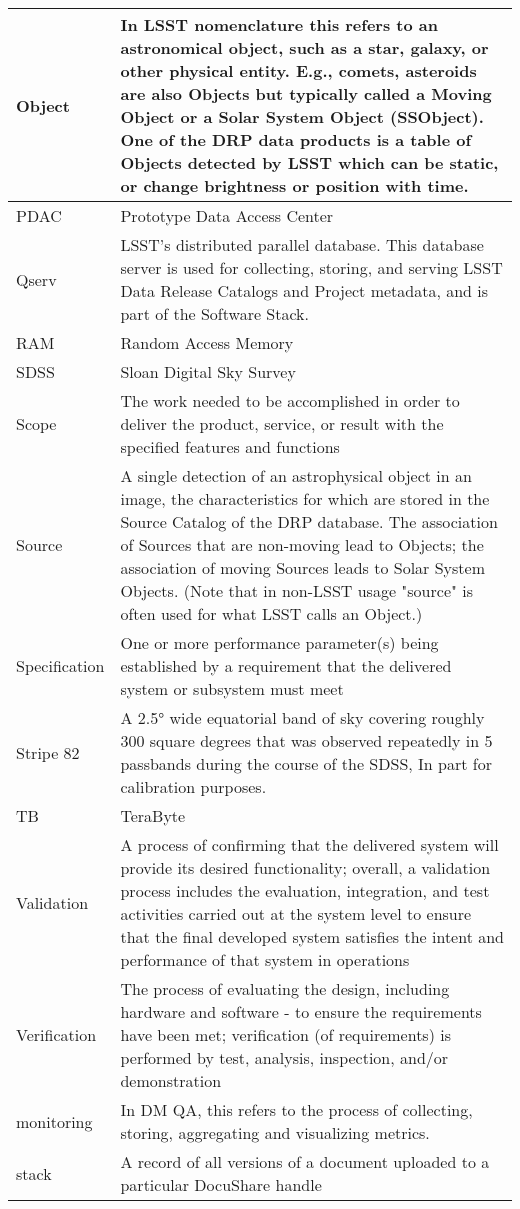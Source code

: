 \begin{longtable}{|l|p{}|}
Object & In LSST nomenclature this refers to an astronomical object, such as a star, galaxy, or other physical entity. E.g., comets, asteroids are also Objects but typically called a Moving Object or a Solar System Object (SSObject). One of the DRP data products is a table of Objects detected by LSST which can be static, or change brightness or position with time. \\\hline
PDAC & Prototype Data Access Center \\\hline
Qserv & LSST's distributed parallel database. This database server is used for collecting, storing, and serving LSST Data Release Catalogs and Project metadata, and is part of the Software Stack. \\\hline
RAM & Random Access Memory \\\hline
SDSS & Sloan Digital Sky Survey \\\hline
Scope & The work needed to be accomplished in order to deliver the product, service, or result with the specified features and functions \\\hline
Source & A single detection of an astrophysical object in an image, the characteristics for which are stored in the Source Catalog of the DRP database. The association of Sources that are non-moving lead to Objects; the association of moving Sources leads to Solar System Objects. (Note that in non-LSST usage "source" is often used for what LSST calls an Object.) \\\hline
Specification & One or more performance parameter(s) being established by a requirement that the delivered system or subsystem must meet \\\hline
Stripe 82 & A 2.5° wide equatorial band of sky covering roughly 300 square degrees that was observed repeatedly in 5 passbands during the course of the SDSS, In part for calibration purposes. \\\hline
TB & TeraByte \\\hline
Validation & A process of confirming that the delivered system will provide its desired functionality; overall, a validation process includes the evaluation, integration, and test activities carried out at the system level to ensure that the final developed system satisfies the intent and performance of that system in operations \\\hline
Verification & The process of evaluating the design, including hardware and software - to ensure the requirements have been met;  verification (of requirements) is performed by test, analysis, inspection, and/or demonstration \\\hline
monitoring & In DM QA, this refers to the process of collecting, storing, aggregating and visualizing metrics. \\\hline
stack & A record of all versions of a document uploaded to a particular DocuShare handle \\\hline
\end{longtable}
